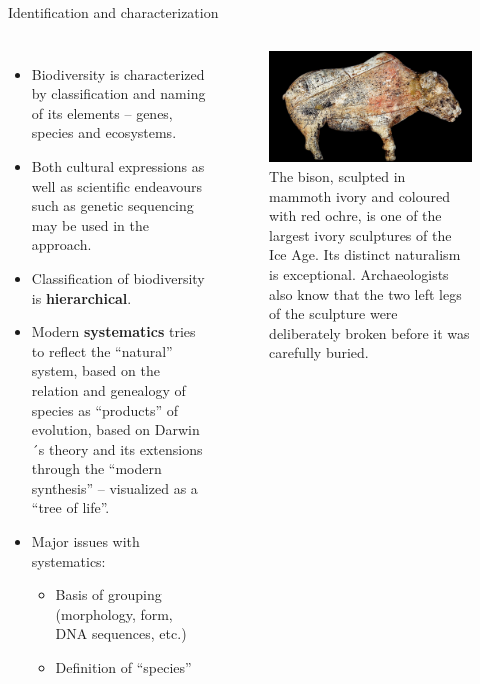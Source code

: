 \documentclass[
  ignorenonframetext,
  aspectratio=169]{beamer}
\providecommand{\tightlist}{%
  \setlength{\itemsep}{0pt}\setlength{\parskip}{0pt}}
\newcommand{\bcolumns}{\begin{columns}[T, onlytextwidth]}
\newcommand{\ecolumns}{\end{columns}}
\begin{document}
\begin{frame}{Identification and characterization}
\protect\hypertarget{identification-and-characterization}{}
\bcolumns
{}
\small

\begin{itemize}
\tightlist
\item
  Biodiversity is characterized by classification and naming of its
  elements -- genes, species and ecosystems.
\item
  Both cultural expressions as well as scientific endeavours such as
  genetic sequencing may be used in the approach.
\item
  Classification of biodiversity is \textbf{hierarchical}.
\item
  Modern \textbf{systematics} tries to reflect the ``natural'' system,
  based on the relation and genealogy of species as ``products'' of
  evolution, based on Darwin´s theory and its extensions through the
  ``modern synthesis'' -- visualized as a ``tree of life''.
\item
  Major issues with systematics:

  \begin{itemize}
  \tightlist
  \item
    Basis of grouping (morphology, form, DNA sequences, etc.)
  \item
    Definition of ``species''
  \end{itemize}
\end{itemize}


\begin{figure}
\includegraphics[width=0.9\linewidth]{../images/zarysk_bison} \caption{The bison, sculpted in mammoth ivory and coloured with red ochre, is one of the largest ivory sculptures of the Ice Age. Its distinct naturalism is exceptional. Archaeologists also know that the two left legs of the sculpture were deliberately broken before it was carefully buried.}\label{fig:zaraysk-bison}
\end{figure}

\ecolumns
\end{frame}
\end{document}
